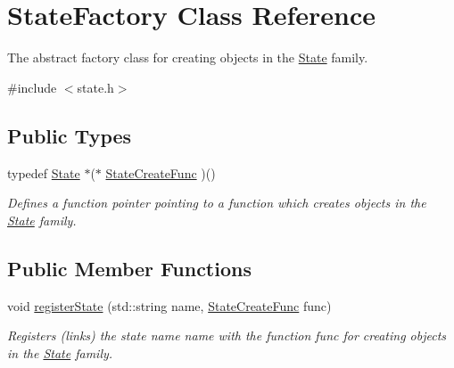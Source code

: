 \hypertarget{classStateFactory}{\section{State\-Factory Class Reference}
\label{classStateFactory}
}


The abstract factory class for creating objects in the \hyperlink{classState}{State} family.  




{\ttfamily \#include $<$state.\-h$>$}

\subsection*{Public Types}
\begin{DoxyCompactItemize}
\item 
\hypertarget{classStateFactory_ab207bad5fc0d332d65c62c5163d9ea77}{typedef \hyperlink{classState}{State} $\ast$($\ast$ \hyperlink{classStateFactory_ab207bad5fc0d332d65c62c5163d9ea77}{State\-Create\-Func} )()}\label{classStateFactory_ab207bad5fc0d332d65c62c5163d9ea77}

\begin{DoxyCompactList}\small\item\em Defines a function pointer pointing to a function which creates objects in the \hyperlink{classState}{State} family. \end{DoxyCompactList}\end{DoxyCompactItemize}
\subsection*{Public Member Functions}
\begin{DoxyCompactItemize}
\item 
void \hyperlink{classStateFactory_a16cb7a68980baccd46c01dcafb26c3ca}{register\-State} (std\-::string name, \hyperlink{classStateFactory_ab207bad5fc0d332d65c62c5163d9ea77}{State\-Create\-Func} func)
\begin{DoxyCompactList}\small\item\em Registers (links) the state name {\itshape name} with the function {\itshape func} for creating objects in the \hyperlink{classState}{State} family. \end{DoxyCompactList}\end{DoxyCompactItemize}
